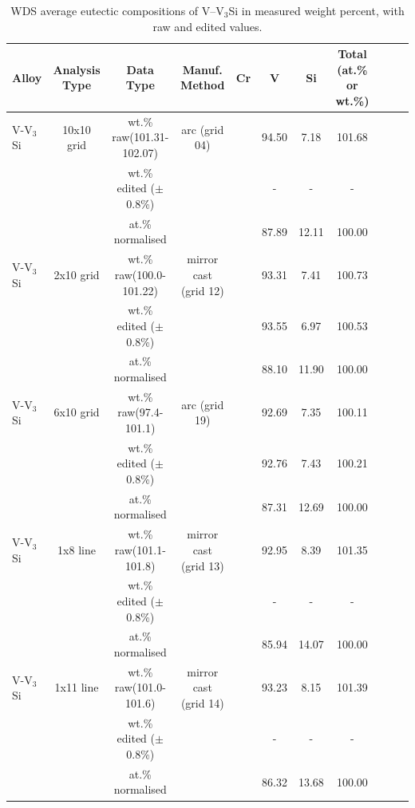 \begin{landscape}\vspace*{\fill}
\begin{table}[htdp]
\begin{center}
\begin{tabular}{lcccccccccc}
\hline
Alloy 			&  Analysis Type		&Data Type & Manuf.  Method	&   Cr    &  V       & Si   		& Total (at.\% or wt.\%) \\
\hline
\hline
V-V$_3$Si 	&10x10 grid		&wt.\% raw(101.31-102.07)&arc (grid 04)&		&94.50		&  7.18   &101.68\\
			   &				   		&wt.\% edited ($\pm$0.8\%) & 			&			&	-		&   -    		&-\\
			   &				   		&at.\% normalised			& 			&			&87.89		&   12.11  	&100.00\\

V-V$_3$Si 	&2x10 grid		&wt.\% raw(100.0-101.22)&mirror cast (grid 12)&		&93.31		& 7.41   &100.73\\
			   &				   		&wt.\% edited ($\pm$0.8\%) & 			&			&	93.55		&  6.97    		&100.53\\
			   &				   		&at.\% normalised			& 			&			&88.10		&   11.90  	&100.00\\
	
V-V$_3$Si 	&6x10 grid		&wt.\% raw(97.4-101.1)&arc (grid 19)&		&92.69		&  7.35   &100.11\\
			   &				   		&wt.\% edited ($\pm$0.8\%) & 			&			&	92.76		&   7.43   		&100.21\\
			   &				   		&at.\% normalised			& 			&			&87.31		&   12.69  	&100.00\\

V-V$_3$Si 	&1x8 line		&wt.\% raw(101.1-101.8)&mirror cast (grid 13)&		&	92.95	&   8.39  &101.35\\
			   &				   		&wt.\% edited ($\pm$0.8\%) & 			&			&	-		&   -    		&-\\
			   &				   		&at.\% normalised			& 			&			&85.94		&   14.07 	&100.00\\

V-V$_3$Si 	&1x11 line		&wt.\% raw(101.0-101.6)&mirror cast (grid 14)&		&	93.23	&   8.15  &101.39\\
			   &				   		&wt.\% edited ($\pm$0.8\%) & 			&			&	-		&   -    		&-\\
			   &				   		&at.\% normalised			& 			&			&86.32	&   13.68 	&100.00\\
	

\hline
\end{tabular}
\end{center}
\caption{WDS average eutectic compositions of V--V$_3$Si in measured weight percent, with raw and edited values.}
\label{tab:v}
\end{table}
\end{landscape}
%

